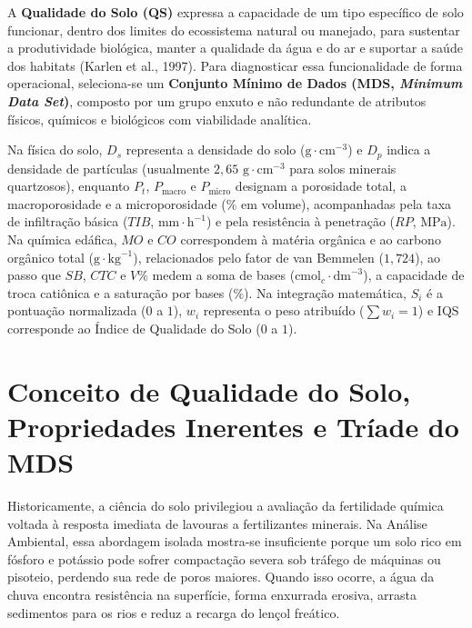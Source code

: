 
\begin{boxSimbolo}
A \textbf{Qualidade do Solo (QS)} expressa a capacidade de um tipo específico de solo funcionar, dentro dos limites do ecossistema natural ou manejado, para sustentar a produtividade biológica, manter a qualidade da água e do ar e suportar a saúde dos habitats (Karlen et al., 1997). Para diagnosticar essa funcionalidade de forma operacional, seleciona-se um \textbf{Conjunto Mínimo de Dados (MDS, \textit{Minimum Data Set})}, composto por um grupo enxuto e não redundante de atributos físicos, químicos e biológicos com viabilidade analítica.

Na física do solo, $D_s$ representa a densidade do solo ($\text{g}\cdot\text{cm}^{-3}$) e $D_p$ indica a densidade de partículas (usualmente $2{,}65\text{ g}\cdot\text{cm}^{-3}$ para solos minerais quartzosos), enquanto $P_t$, $P_{\text{macro}}$ e $P_{\text{micro}}$ designam a porosidade total, a macroporosidade e a microporosidade ($\%$ em volume), acompanhadas pela taxa de infiltração básica ($TIB$, $\text{mm}\cdot\text{h}^{-1}$) e pela resistência à penetração ($RP$, $\text{MPa}$). Na química edáfica, $MO$ e $CO$ correspondem à matéria orgânica e ao carbono orgânico total ($\text{g}\cdot\text{kg}^{-1}$), relacionados pelo fator de van Bemmelen ($1{,}724$), ao passo que $SB$, $CTC$ e $V\%$ medem a soma de bases ($\text{cmol}_c\cdot\text{dm}^{-3}$), a capacidade de troca catiônica e a saturação por bases ($\%$). Na integração matemática, $S_i$ é a pontuação normalizada ($0$ a $1$), $w_i$ representa o peso atribuído ($\sum w_i = 1$) e $\text{IQS}$ corresponde ao Índice de Qualidade do Solo ($0$ a $1$).
\end{boxSimbolo}

\section{Conceito de Qualidade do Solo, Propriedades Inerentes e Tríade do MDS}

Historicamente, a ciência do solo privilegiou a avaliação da fertilidade química voltada à resposta imediata de lavouras a fertilizantes minerais. Na Análise Ambiental, essa abordagem isolada mostra-se insuficiente porque um solo rico em fósforo e potássio pode sofrer compactação severa sob tráfego de máquinas ou pisoteio, perdendo sua rede de poros maiores. Quando isso ocorre, a água da chuva encontra resistência na superfície, forma enxurrada erosiva, arrasta sedimentos para os rios e reduz a recarga do lençol freático.

